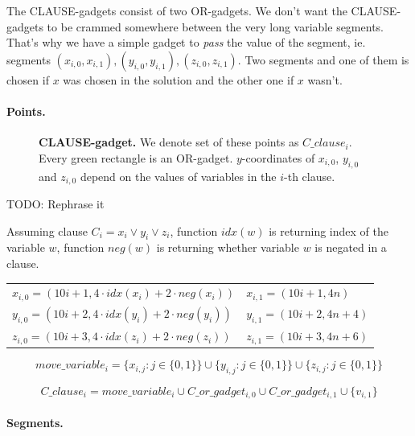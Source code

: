 The CLAUSE-gadgets consist of two OR-gadgets.
We don't want the CLAUSE-gadgets to be crammed 
somewhere between
the very long variable segments. That's why we have a simple
gadget to \textit{pass} the value of the segment, ie. segments
$(x_{i, 0}, x_{i, 1}), (y_{i, 0}, y_{i, 1}), (z_{i, 0}, z_{i, 1})$.
Two segments and one of them is chosen if $x$ was chosen
in the solution and the other one if $x$ wasn't.

\paragraph{Points.}


\begin{figure}[h]
\centering
\def\svgwidth{0.8\columnwidth}

\caption{\textbf{CLAUSE-gadget.}
We denote set of these points as $C\_clause_i$.
Every green rectangle is an OR-gadget.
$y$-coordinates of $x_{i, 0}$, $y_{i, 0}$ and $z_{i,0}$
depend on the values of variables in the $i$-th clause.
}
\label{fig:apx_clause}
\end{figure}

TODO: Rephrase it

Assuming clause $C_i = x_i \lor y_i \lor z_i$,
function $idx(w)$ is returning index of the variable $w$,
function $neg(w)$ is returning whether variable $w$ is negated
in a clause.

\begin{center}
\begin{tabular}{ l l }
	$x_{i, 0} = (10i+1, 4\cdot idx(x_i) + 2\cdot neg(x_i))$ &
	$x_{i, 1} = (10i+1, 4n)$ \\
	$y_{i, 0} = (10i+2, 4\cdot idx(y_i) + 2\cdot neg(y_i))$ &
	$y_{i, 1} = (10i+2, 4n + 4)$ \\
	$z_{i, 0} = (10i+3, 4\cdot idx(z_i) + 2\cdot neg(z_i))$ &
	$z_{i, 1} = (10i+3, 4n + 6)$
\end{tabular}
\end{center}
	
 
 $$move\_variable_i = 
 \{x_{i, j} : j \in \{0, 1\}\} \cup
 \{y_{i, j} : j \in \{0, 1\}\} \cup
 \{z_{i, j} : j \in \{0, 1\}\} 
 $$
 
 $$C\_clause_i = 
 move\_variable_i \cup C\_or\_gadget_{i, 0}
 \cup C\_or\_gadget_{i, 1} \cup \{v_{i, 1} \} 
 $$

\paragraph{Segments.}

